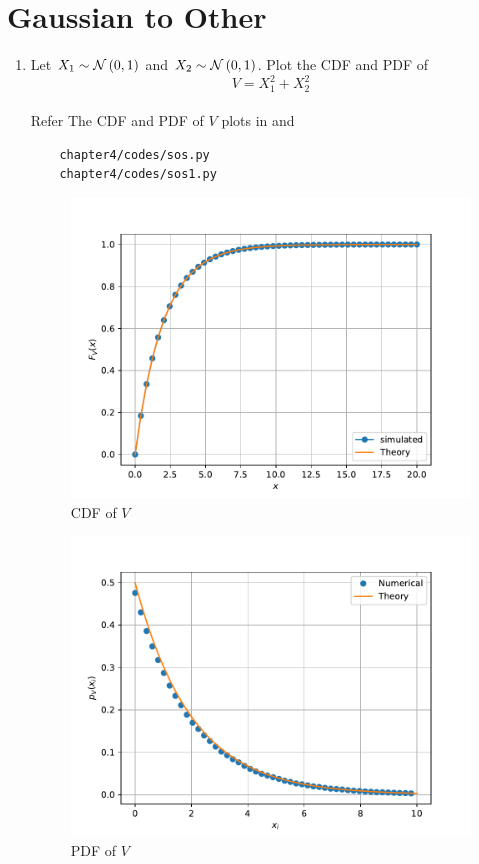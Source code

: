 \section{Gaussian to Other}
\begin{enumerate}
\item
Let $X_1 \sim  \mathcal{N}\left(0,1\right)$ and $X_2 \sim  \mathcal{N}\left(0,1\right)$. Plot the CDF and PDF of
%
\begin{equation}
V = X_1^2 + X_2^2
\end{equation}\\
\solution Refer The CDF and PDF of $V$ plots in  and  
\begin{lstlisting}
	chapter4/codes/sos.py
	chapter4/codes/sos1.py
\end{lstlisting}
\begin{figure}[H]
\centering
\includegraphics[scale=0.8]{chapter4/figs/chisq_cdf.pdf}
\caption{CDF of $V$}
\label{fig:chisq_cdf}
\end{figure}
\begin{figure}[H]
\centering
\includegraphics[scale=0.8]{chapter4/figs/chisq_pdf.pdf}
\caption{PDF of $V$}
\label{fig:chisq_pdf}
\end{figure}
%


\end{enumerate}
